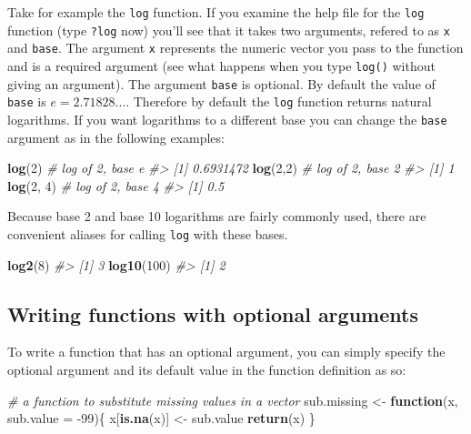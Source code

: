 \documentclass[]{book}
\newenvironment{Shaded}{\begin{snugshade}}{\end{snugshade}}
\newcommand{\CommentTok}[1]{\textcolor[rgb]{0.56,0.35,0.01}{\textit{#1}}}
\newcommand{\ControlFlowTok}[1]{\textcolor[rgb]{0.13,0.29,0.53}{\textbf{#1}}}
\newcommand{\DataTypeTok}[1]{\textcolor[rgb]{0.13,0.29,0.53}{#1}}
\newcommand{\DecValTok}[1]{\textcolor[rgb]{0.00,0.00,0.81}{#1}}
\newcommand{\KeywordTok}[1]{\textcolor[rgb]{0.13,0.29,0.53}{\textbf{#1}}}
\newcommand{\NormalTok}[1]{#1}
\newcommand{\StringTok}[1]{\textcolor[rgb]{0.31,0.60,0.02}{#1}}
\theoremstyle{definition}
\theoremstyle{definition}
\theoremstyle{definition}
\theoremstyle{remark}
\begin{document}
Take for example the \texttt{log} function. If you examine the help file
for the \texttt{log} function (type \texttt{?log} now) you'll see that
it takes two arguments, refered to as \texttt{x} and \texttt{base}. The
argument \texttt{x} represents the numeric vector you pass to the
function and is a required argument (see what happens when you type
\texttt{log()} without giving an argument). The argument \texttt{base}
is optional. By default the value of \texttt{base} is
\(e = 2.71828\ldots\). Therefore by default the \texttt{log} function
returns natural logarithms. If you want logarithms to a different base
you can change the \texttt{base} argument as in the following examples:

\begin{Shaded}
\begin{Highlighting}[]
\KeywordTok{log}\NormalTok{(}\DecValTok{2}\NormalTok{) }\CommentTok{# log of 2, base e}
\CommentTok{#> [1] 0.6931472}
\KeywordTok{log}\NormalTok{(}\DecValTok{2}\NormalTok{,}\DecValTok{2}\NormalTok{) }\CommentTok{# log of 2, base 2}
\CommentTok{#> [1] 1}
\KeywordTok{log}\NormalTok{(}\DecValTok{2}\NormalTok{, }\DecValTok{4}\NormalTok{) }\CommentTok{# log of 2, base 4}
\CommentTok{#> [1] 0.5}
\end{Highlighting}
\end{Shaded}

Because base 2 and base 10 logarithms are fairly commonly used, there
are convenient aliases for calling \texttt{log} with these bases.

\begin{Shaded}
\begin{Highlighting}[]
\KeywordTok{log2}\NormalTok{(}\DecValTok{8}\NormalTok{)}
\CommentTok{#> [1] 3}
\KeywordTok{log10}\NormalTok{(}\DecValTok{100}\NormalTok{)}
\CommentTok{#> [1] 2}
\end{Highlighting}
\end{Shaded}

\hypertarget{writing-functions-with-optional-arguments}{%
\subsection{Writing functions with optional
arguments}\label{writing-functions-with-optional-arguments}}

To write a function that has an optional argument, you can simply
specify the optional argument and its default value in the function
definition as so:

\begin{Shaded}
\begin{Highlighting}[]
\CommentTok{# a function to substitute missing values in a vector}
\NormalTok{sub.missing <-}\StringTok{ }\ControlFlowTok{function}\NormalTok{(x, }\DataTypeTok{sub.value =} \DecValTok{-99}\NormalTok{)\{}
\NormalTok{  x[}\KeywordTok{is.na}\NormalTok{(x)] <-}\StringTok{ }\NormalTok{sub.value}
  \KeywordTok{return}\NormalTok{(x)}
\NormalTok{\}}
\end{Highlighting}
\end{Shaded}
\end{document}
